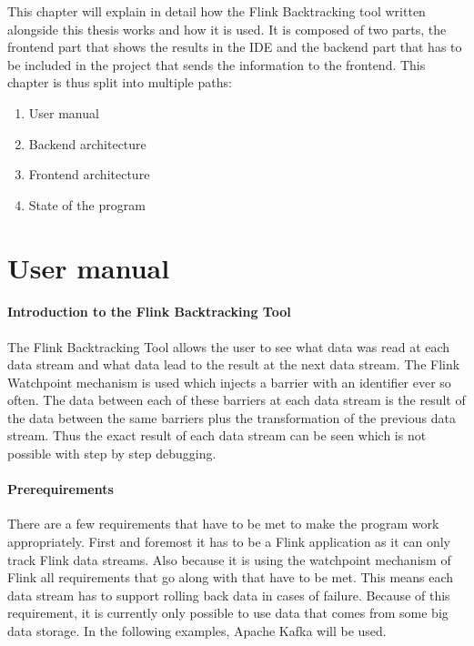 This chapter will explain in detail how the Flink Backtracking tool written alongside this thesis works and how it is used. It is composed of two parts, the frontend part that shows the results in the IDE and the backend part that has to be included in the project that sends the information to the frontend. This chapter is thus split into multiple paths:
\begin{enumerate}
  \item[\ref{fbManual}] User manual
  \item[\ref{fbBackend}] Backend architecture
  \item[\ref{fbFrontend}] Frontend architecture
  \item[\ref{fbState}] State of the program
\end{enumerate}

\section{User manual}
\label{fbManual}

\paragraph{Introduction to the Flink Backtracking Tool}
The Flink Backtracking Tool allows the user to see what data was read at each data stream and what data lead to the result at the next data stream. The Flink Watchpoint mechanism is used which injects a barrier with an identifier ever so often. The data between each of these barriers at each data stream is the result of the data between the same barriers plus the transformation of the previous data stream. Thus the exact result of each data stream can be seen which is not possible with step by step debugging.

\paragraph{Prerequirements} There are a few requirements that have to be met to make the program work appropriately. First and foremost it has to be a Flink application as it can only track Flink data streams. Also because it is using the watchpoint mechanism of Flink all requirements that go along with that have to be met. This means each data stream has to support rolling back data in cases of failure. Because of this requirement, it is currently only possible to use data that comes from some big data storage. In the following examples, Apache Kafka will be used.

